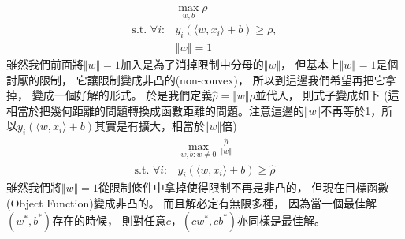   \begin{equation} 
    \begin{split}
      &\max_{w, b} \rho \\
      \text{s.t. } \forall i: &y_i ( \langle w, x_i \rangle + b) \geq \rho, \\
      &\Vert w \Vert = 1 
    \end{split}
  \end{equation}        
  雖然我們前面將$\Vert w \Vert = 1$加入是為了消掉限制中分母的$\Vert w \Vert$，
  但基本上$\Vert w \Vert = 1$是個討厭的限制，
  它讓限制變成非凸的(non-convex)，
  所以到這邊我們希望再把它拿掉，
  變成一個好解的形式。
  於是我們定義$\hat{\rho} = \Vert w \Vert \rho$並代入，
  則式子變成如下
  (這相當於把幾何距離的問題轉換成函數距離的問題。注意這邊的$\Vert w \Vert$不再等於1，所以$y_i ( \langle w, x_i \rangle + b)$其實是有擴大，相當於$\Vert w \Vert$倍)
  \begin{equation}
    \begin{split}
      &\max_{w, b: w \neq 0} \frac{\hat{\rho}}{\Vert w \Vert} \\
      \text{s.t. } \forall i: &y_i ( \langle w, x_i \rangle + b ) \geq \hat{\rho}
    \end{split}
  \end{equation}    
  雖然我們將$\Vert w \Vert = 1$從限制條件中拿掉使得限制不再是非凸的，
  但現在目標函數(Object Function)變成非凸的。
  而且解必定有無限多種，
  因為當一個最佳解$(w^{*}, b^{*})$存在的時候，
  則對任意$c$，$(cw^{*}, c b^{*})$亦同樣是最佳解。

